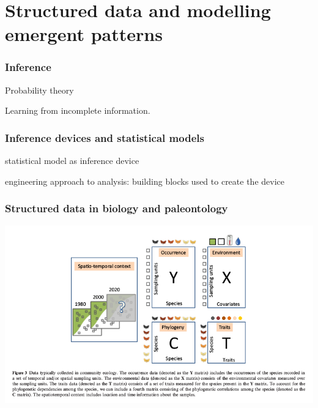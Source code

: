 \documentclass{beamer}
\begin{document}
\section{Structured data and modelling emergent patterns}

\begin{frame}
  \frametitle{Inference}

  Probability theory 

  Learning from incomplete information.

\end{frame}

\begin{frame}
  \frametitle{Inference devices and statistical models}

  statistical model as inference device

  engineering approach to analysis: building blocks used to create the device
\end{frame}

\begin{frame}
  \frametitle{Structured data in biology and paleontology}

  \includegraphics[width = \textwidth,height = 0.8\textheight,keepaspectratio = true]{figure/ovaskainen_data}

  \footnotesize{}
\end{frame}
\end{document}
